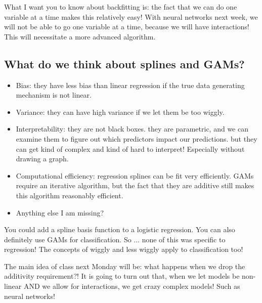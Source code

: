 What I want you to know about backfitting is: the fact that we can do one variable at a time makes this relatively easy! With neural networks next week, we will not be able to go one variable at a time, because we will have interactions! This will necessitate a more advanced algorithm. 


\subsection{What do we think about splines and GAMs?}
\begin{itemize}
\item Bias: they have less bias than linear regression if the true data generating mechanism is not linear. 
\item Variance: they can have high variance if we let them be too wiggly. 
\item Interpretability: they are not black boxes. they are parametric, and we can examine them to figure out which predictors impact our predictions. but they can get kind of complex and kind of hard to interpret! Especially without drawing a graph. 
\item Computational efficiency: regression splines can be fit very efficiently. GAMs require an iterative algorithm, but the fact that they are additive still makes this algorithm reasonably efficient. 
\item Anything else I am missing? 	
\end{itemize}

You could add a spline basis function to a logistic regression. You can also definitely use GAMs for classification. So ... none of this was specific to regression! The concepts of wiggly and less wiggly apply to classification too!

The main idea of class next Monday will be: what happens when we drop the additivity requirement?! It is going to turn out that, when we let models be non-linear AND we allow for interactions, we get crazy complex models! Such as neural networks!









